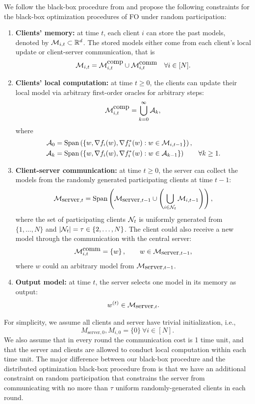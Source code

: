 We follow the black-box procedure from \cite{Scaman2017OptimalAF,Scaman2018OptimalAF} and propose the following constraints for the black-box optimization procedures of FO under random participation:
\begin{enumerate}
    \item \textbf{Clients' memory:} at time $t$, each client $i$ can store the past models, denoted by $\mathcal{M}_{i,t} \subset \mathbb{R}^d$. The stored models  either come from each client's local update or client-server communication, that is
    \[
        \mathcal{M}_{i,t} = \mathcal{M}_{i,t}^{\mbox{comp}} \cup \mathcal{M}_{i,t}^{\mbox{comm}} \quad \forall i \in [N].
    \]
    \item \textbf{Clients' local computation:} at time $t \geq 0$, the clients can update their local model via arbitrary first-order oracles for arbitrary steps:
    \[
        \mathcal{M}_{i,t}^{\mbox{comp}} = \bigcup_{k=0}^{\infty} \mathcal{A}_k,
    \]
    where
    \begin{align*}
        \mathcal{A}_0 &= \mathrm{Span}\left( \left\{  w, \nabla f_i(w), \nabla f_i^*(w) : w \in \mathcal{M}_{i,t-1}  \right\} \right), \\
        \mathcal{A}_k &= \mathrm{Span}\left( \left\{  w, \nabla f_i(w), \nabla f_i^*(w) : w \in \mathcal{A}_{k-1}  \right\} \right) \qquad \forall k \geq 1.
    \end{align*}
    \item \textbf{Client-server communication:} at time $t \geq 0$, the server can collect the models from the randomly generated participating clients at time $t-1$:
    \[
        \mathcal{M}_{\mbox{server}, t} = \mathrm{Span} \left( \mathcal{M}_{\mbox{server}, t-1} \cup  \left( \bigcup_{i \in \mathcal{N}_t} \mathcal{M}_{i, t-1} \right) \right),
    \]
    where the set of participating clients $\mathcal{N}_t$ is uniformly generated from $\{1, \dots, N\}$ and $|\mathcal{N}_t| = \tau \in \{2, \dots, N\}$. The client could also receive a new model through the communication with the central server:
    \[
        \mathcal{M}_{i,t}^{\mbox{comm}} = \left\{ w \right\}, \qquad w \in \mathcal{M}_{\mbox{server}, t-1},
    \]
    where $w$ could an arbitrary model from $\mathcal{M}_{\mbox{server}, t-1}$.
    \item \textbf{Output model:} at time $t$, the server selects one model in its memory as output:
    \[
        w^{(t)} \in \mathcal{M}_{\mbox{server}, t}.
    \]
\end{enumerate}

For simplicity, we assume all clients and server have trivial initialization, i.e.,
\[M_{\mbox{server}, 0}, M_{i,0} = \{0\}~\forall i \in [N].\] 
We also assume that in every round the communication cost is 1 time unit, and that the server and clients are allowed to conduct local computation within each time unit. The major difference between our black-box procedure and the distributed optimization black-box procedure from \citet{Scaman2017OptimalAF} is that we have an additional constraint on random participation that constrains the server from communicating with no more than $\tau$ uniform randomly-generated clients in each round.

